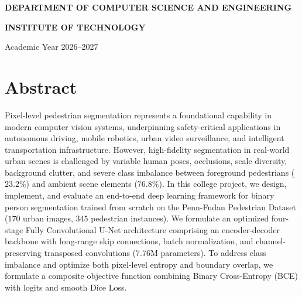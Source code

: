 \documentclass[10pt,a4paper]{report}
\begin{document}
\begin{titlepage}
    \vfill
    {\small\textbf{DEPARTMENT OF COMPUTER SCIENCE AND ENGINEERING}\par}
    {\normalsize\textbf{INSTITUTE OF TECHNOLOGY}\par}
    {\footnotesize Academic Year 2026--2027\par}
    \vspace{0.2cm}
\end{titlepage}

\setcounter{page}{2}

\chapter*{Abstract}
Pixel-level pedestrian segmentation represents a foundational capability in modern computer vision systems, underpinning safety-critical applications in autonomous driving, mobile robotics, urban video surveillance, and intelligent transportation infrastructure. However, high-fidelity segmentation in real-world urban scenes is challenged by variable human poses, occlusions, scale diversity, background clutter, and severe class imbalance between foreground pedestrians ($23.2\%$) and ambient scene elements ($76.8\%$). In this college project, we design, implement, and evaluate an end-to-end deep learning framework for binary person segmentation trained from scratch on the Penn-Fudan Pedestrian Dataset ($170$ urban images, $345$ pedestrian instances). We formulate an optimized four-stage Fully Convolutional U-Net architecture comprising an encoder-decoder backbone with long-range skip connections, batch normalization, and channel-preserving transposed convolutions ($7.76$M parameters). To address class imbalance and optimize both pixel-level entropy and boundary overlap, we formulate a composite objective function combining Binary Cross-Entropy (BCE) with logits and smooth Dice Loss.
\end{document}
